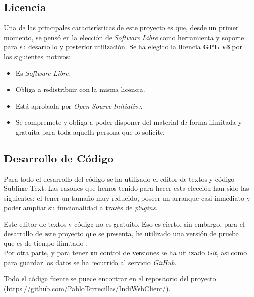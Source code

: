 \subsection{Licencia}
Una de las principales características de este proyecto es que, desde un primer momento, se pensó en la elección de \textit{Software Libre} como herramienta y soporte para su desarrollo y posterior utilización. Se ha elegido  la licencia \textbf{GPL v3} por los siguientes motivos:

\begin{itemize}
  \item Es \textit{Software Libre}.
  \item Obliga a redistribuir con la misma licencia.
  \item Está aprobada por \textit{Open Source Initiative}.
  \item Se compromete y obliga a poder disponer del material de forma ilimitada y gratuita para toda aquella persona que lo solicite.
\end{itemize}

\subsection{Desarrollo de Código}
Para todo el desarrollo del código se ha utilizado el editor de textos y código Sublime Text\cite{Sublime}.
Las razones que hemos tenido para hacer esta elección han sido las siguientes: el tener un tamaño muy reducido, poseer un arranque casi inmediato y poder ampliar su funcionalidad a través de \textit{plugins}.

Este editor de textos y código no es gratuito. Eso es cierto, sin embargo, para el desarrollo de este proyecto que se presenta, he utilizado una versión de prueba que es de tiempo ilimitado \cite{BeneficiosSublime}.\\

Por otra parte, y para tener un control de versiones se ha utilizado \textit{Git}, así como para guardar los datos se ha recurrido al servicio \textit{GitHub}\cite{GitHub}.

Todo el código fuente se puede encontrar en el \href{https://github.com/PabloTorrecillas/IndiWebClient}{repositorio del proyecto} (https://github.com/PabloTorrecillas/IndiWebClient/).
